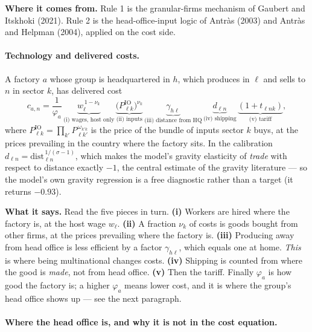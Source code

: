 \documentclass[11pt]{article}
\newcommand{\says}[1]{\smallskip\noindent\textbf{What it says.} #1\smallskip}
\newcommand{\from}[1]{\smallskip\noindent\textbf{Where it comes from.} #1\smallskip}
\theoremstyle{plain}
\theoremstyle{remark}
\theoremstyle{definition}
\begin{document}
\from{Rule 1 is the granular-firms mechanism of Gaubert and Itskhoki (2021). Rule 2 is
the head-office-input logic of Antr\`as (2003) and Antr\`as and Helpman (2004),
applied on the cost side.}

\paragraph{Technology and delivered costs.}

A factory $a$ whose group is headquartered in $h$, which produces in $\ell$ and sells
to $n$ in sector $k$, has delivered cost
\begin{equation}
  c_{a,n}=\frac{1}{\varphi_a}\,
  \underbrace{w_\ell^{\,1-\nu_k}}_{\text{(i) wages, host only}}\,
  \underbrace{\bigl(P^{\text{IO}}_{\ell k}\bigr)^{\nu_k}}_{\text{(ii) inputs}}\,
  \underbrace{\gamma_{h\ell}}_{\text{(iii) distance from HQ}}\,
  \underbrace{d_{\ell n}}_{\text{(iv) shipping}}\,
  \underbrace{(1+t_{\ell n k})}_{\text{(v) tariff}},
  \label{eq:cost}
\end{equation}
where $P^{\text{IO}}_{\ell k}=\prod_{k'}P_{\ell k'}^{\,\omega_{k'k}}$ is the price of
the bundle of inputs sector $k$ buys, at the prices prevailing in the country where
the factory sits. In the calibration $d_{\ell n}=\mathrm{dist}_{\ell n}^{\,1/(\sigma-1)}$,
which makes the model's gravity elasticity of \emph{trade} with respect to distance
exactly $-1$, the central estimate of the gravity literature --- so the model's own
gravity regression is a free diagnostic rather than a target (it returns $-0.93$).

\says{Read the five pieces in turn.
\textbf{(i)} Workers are hired where the factory is, at the host wage $w_\ell$.
\textbf{(ii)} A fraction $\nu_k$ of costs is goods bought from other firms, at the
prices prevailing where the factory is.
\textbf{(iii)} Producing away from head office is less efficient by a factor
$\gamma_{h\ell}$, which equals one at home. \emph{This} is where being multinational
changes costs.
\textbf{(iv)} Shipping is counted from where the good is \emph{made}, not from head
office.
\textbf{(v)} Then the tariff.
Finally $\varphi_a$ is how good the factory is; a higher $\varphi_a$ means lower cost,
and it is where the group's head office shows up --- see the next paragraph.}

\paragraph{Where the head office is, and why it is not in the cost equation.}
\label{sec:hqchoice}
\end{document}
